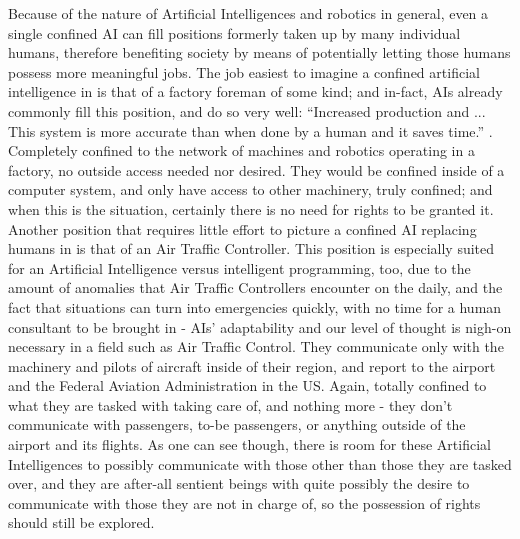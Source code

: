 Because of the nature of Artificial Intelligences and robotics in general, even a single confined AI can fill positions formerly taken up by many individual humans, therefore benefiting society by means of potentially letting those humans possess more meaningful jobs. The job easiest to imagine a confined artificial intelligence in is that of a factory foreman of some kind; and in-fact, AIs already commonly fill this position, and do so very well: “Increased production and ... This system is more accurate than when done by a human and it saves time.” \cite{teresacattaneo2002}. Completely confined to the network of machines and robotics operating in a factory, no outside access needed nor desired. They would be confined inside of a computer system, and only have access to other machinery, truly confined; and when this is the situation, certainly there is no need for rights to be granted it. Another position that requires little effort to picture a confined AI replacing humans in is that of an Air Traffic Controller. This position is especially suited for an Artificial Intelligence versus intelligent programming, too, due to the amount of anomalies that Air Traffic Controllers encounter on the daily, and the fact that situations can turn into emergencies quickly, with no time for a human consultant to be brought in - AIs' adaptability and our level of thought is nigh-on necessary in a field such as Air Traffic Control. They communicate only with the machinery and pilots of aircraft inside of their region, and report to the airport and the Federal Aviation Administration in the US. Again, totally confined to what they are tasked with taking care of, and nothing more - they don't communicate with passengers, to-be passengers, or anything outside of the airport and its flights. As one can see though, there is room for these Artificial Intelligences to possibly communicate with those other than those they are tasked over, and they are after-all sentient beings with quite possibly the desire to communicate with those they are not in charge of, so the possession of rights should still be explored.